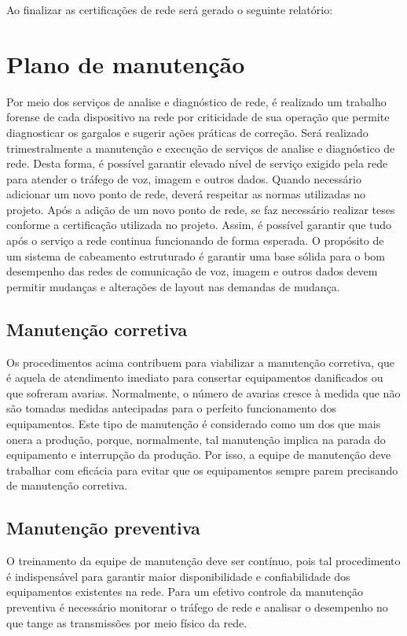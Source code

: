 \documentclass[	DIV=calc,%
							paper=a4,%
							fontsize=12pt,%
							onecolumn]{scrartcl}	 					%
\begin{document}


Ao finalizar as certificações de rede será gerado o seguinte relatório:

\section{Plano de manutenção}

Por meio dos serviços de analise e diagnóstico de rede, é realizado um trabalho forense de cada dispositivo na rede por criticidade de sua operação que permite diagnosticar os gargalos e sugerir ações práticas de correção.
Será realizado trimestralmente a manutenção e execução de serviços de analise e diagnóstico de rede. Desta forma, é possível garantir elevado nível de serviço exigido pela rede para atender o tráfego de voz, imagem e outros dados.
Quando necessário adicionar um novo ponto de rede, deverá respeitar as normas utilizadas no projeto. Após a adição de um novo ponto de rede, se faz necessário realizar teses conforme a certificação utilizada no projeto. Assim, é possível garantir que tudo após o serviço a rede continua funcionando de forma esperada.
O propósito de um sistema de cabeamento estruturado é garantir uma base sólida para o bom desempenho das redes de comunicação de voz, imagem e outros dados devem permitir mudanças e alterações de layout nas demandas de mudança.
\subsection{Manutenção corretiva}
Os procedimentos acima contribuem para viabilizar a manutenção corretiva, que é aquela de atendimento imediato para consertar equipamentos danificados ou que sofreram avarias. Normalmente, o número de avarias cresce à medida que não são tomadas medidas antecipadas para o perfeito funcionamento dos equipamentos.
Este tipo de manutenção é considerado como um dos que mais onera a produção, porque, normalmente, tal manutenção implica na parada do equipamento e interrupção da produção. Por isso, a equipe de manutenção deve trabalhar com eficácia para evitar que os equipamentos sempre parem precisando de manutenção corretiva.
\subsection{Manutenção preventiva}
O treinamento da equipe de manutenção deve ser contínuo, pois tal procedimento é indispensável para garantir maior disponibilidade e confiabilidade dos equipamentos existentes na rede. Para um efetivo controle da manutenção preventiva é necessário monitorar o tráfego de rede e analisar o desempenho no que tange as transmissões por meio físico da rede. 
\end{document}
